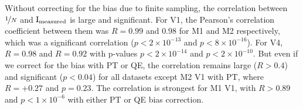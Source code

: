 Without correcting for the bias due to finite sampling, the correlation between $\nicefrac{1}{N}$ and $\operatorname{I}_{\text{measured}}$ is large and significant.
For \ac{V1}, the Pearson's correlation coefficient between them was $R=0.99$ and $0.98$ for \ac{M1} and \ac{M2} respectively, which was a significant correlation ($p < 2 \times 10^{-13}$ and $p < 8 \times 10^{-16}$).
For \ac{V4}, $R=0.98$ and $R=0.92$ with p-values $p < 2 \times 10^{-14}$ and $p < 2 \times 10^{-10}$.
But even if we correct for the bias with \ac{PT} or \ac{QE}, the correlation remains large ($R>0.4$) and significant ($p<0.04$) for all datasets except \ac{M2} \ac{V1} with \ac{PT}, where $R=+0.27$ and $p=0.23$.
The correlation is strongest for \ac{M1} \ac{V1}, with $R>0.89$ and $p < 1 \times 10^{-6}$ with either \ac{PT} or \ac{QE} bias correction.


